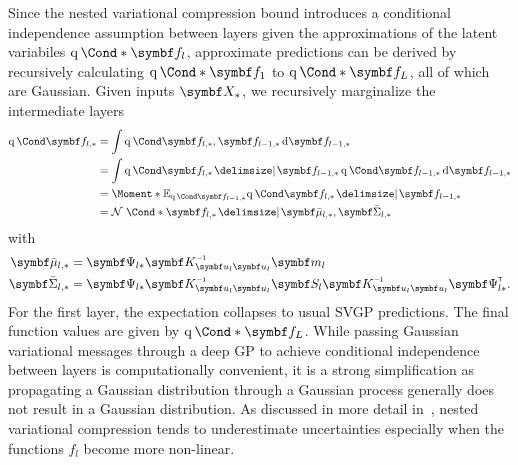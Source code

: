 Since the nested variational compression bound introduces a conditional independence assumption between layers given the approximations of the latent variabiles $\Variat*{\mat{f}_l}$, approximate predictions can be derived by recursively calculating $\Variat*{\mat{f}_1}$ to $\Variat*{\mat{f}_L}$, all of which are Gaussian.
Given inputs $\mat{X_{\ast}}$, we recursively marginalize the intermediate layers
\begin{align}
    \begin{split}
        \Variat{\mat{f}_{l, \ast}}
        &= \int \Variat{\mat{f}_{l, \ast}, \mat{f}_{l-1, \ast}} \diff \mat{f}_{l-1, \ast} \\
        &= \int \Variat{\mat{f}_{l, \ast} \given \mat{f}_{l-1, \ast}} \Variat{\mat{f}_{l-1, \ast}} \diff \mat{f}_{l-1, \ast} \\
        &= \Moment*{\E_{\Variat{\mat{f}_{l-1, \ast}}}}{\Variat{\mat{f}_{l, \ast} \given \mat{f}_{l-1, \ast}}} \\
        &= \Gaussian*{\mat{f}_{l, \ast} \given \mat{\bar{\mu}}_{l, \ast}, \mat{\bar{\Sigma}}_{l, \ast}}
    \end{split}
\end{align}
with
\begin{align*}
    \mat{\bar{\mu}}_{l, \ast}    & = \mat{\Psi}_{l\ast} \mat{K}_{\mat{u}_l \mat{u}_l    }\inv \mat{m}_l                                       \\
    \mat{\bar{\Sigma}_{l, \ast}} & = \mat{\Psi}_{l\ast}\mat{K}_{\mat{u}_l \mat{u}_l}\inv\mat{S}_l\mat{K}_{\mat{u}_l \mat{u}_l}\inv\mat{\Psi}_{l\ast}\tran.
\end{align*}
For the first layer, the expectation collapses to usual SVGP predictions.
The final function values are given by $\Variat*{\mat{f}_L}$.
While passing Gaussian variational messages through a deep GP to achieve conditional independence between layers is computationally convenient, it is a strong simplification as propagating a Gaussian distribution through a Gaussian process generally does not result in a Gaussian distribution.
As discussed in more detail in~\parencite{hensman_nested_2014}, nested variational compression tends to underestimate uncertainties especially when the functions $f_l$ become more non-linear.

